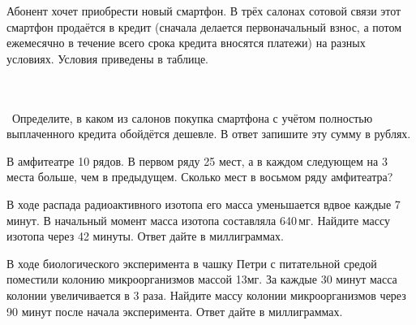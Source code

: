\begin{class}[number=7]
\begin{listofex}
		 
		\item Абонент хочет приобрести новый смартфон. В трёх салонах сотовой связи этот смартфон продаётся в кредит (сначала делается первоначальный взнос, а потом ежемесячно в течение всего срока кредита вносятся платежи) на разных условиях. Условия приведены в таблице.\\\
		\begin{figure}[h]
		\end{figure}
		\\\ Определите, в каком из салонов покупка смартфона с учётом полностью выплаченного кредита обойдётся дешевле. В ответ запишите эту сумму в рублях.
		
		\item В амфитеатре 10 рядов. В первом ряду 25 мест, а в каждом следующем на 3 места больше, чем в предыдущем. Сколько мест в восьмом ряду амфитеатра?
		\item В ходе распада радиоактивного изотопа его масса уменьшается вдвое каждые 7 минут. В начальный момент масса изотопа составляла 640 мг. Найдите массу изотопа через 42 минуты. Ответ дайте в миллиграммах.
		\item В ходе биологического эксперимента в чашку Петри с питательной средой поместили колонию микроорганизмов массой 13мг. За каждые 30 минут масса колонии увеличивается в 3 раза. Найдите массу колонии микроорганизмов через 90 минут после начала эксперимента. Ответ дайте в миллиграммах.
	\end{listofex}
\end{class}

